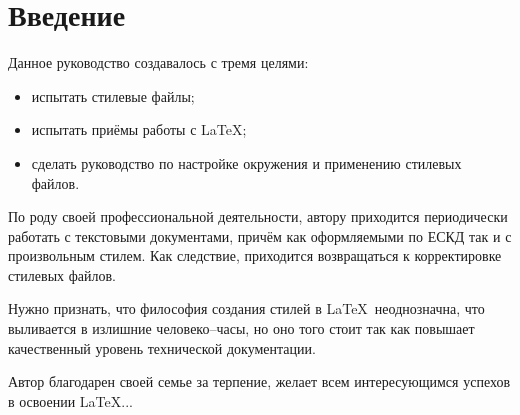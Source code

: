 \section*{Введение}

Данное руководство создавалось с тремя целями:
\begin{itemize}
\item испытать стилевые файлы;
\item испытать приёмы работы с \LaTeX;
\item сделать руководство по настройке окружения и применению стилевых файлов.
\end{itemize}

По роду своей профессиональной деятельности, автору приходится периодически работать с текстовыми документами, причём как оформляемыми по ЕСКД так и с произвольным стилем. Как следствие, приходится возвращаться к корректировке стилевых файлов.

Нужно признать, что философия создания стилей в \LaTeX~неоднозначна, что выливается в излишние человеко–часы, но оно того стоит так как повышает качественный уровень технической документации.

Автор благодарен своей семье за терпение, желает всем интересующимся успехов в освоении \LaTeX ...

